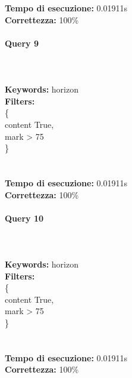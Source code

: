 \documentclass[12pt]{article}
\begin{document}
\noindent
\textbf{Tempo di esecuzione:} 0.01911s \\
\textbf{Correttezza:} 100\% \pagebreak

\paragraph{Query 9} ~ \\ \\

\noindent \textbf{Keywords: } horizon \\
\textbf{Filters: } \\
\indent \{ \\
\indent \indent content True, \\
\indent \indent mark > 75 \\
\indent \} \\\\\\


\noindent
\textbf{Tempo di esecuzione:} 0.01911s \\
\textbf{Correttezza:} 100\% \pagebreak

\paragraph{Query 10} ~ \\ \\

\noindent \textbf{Keywords: } horizon \\
\textbf{Filters: } \\
\indent \{ \\
\indent \indent content True, \\
\indent \indent mark > 75 \\
\indent \} \\\\\\


\noindent
\textbf{Tempo di esecuzione:} 0.01911s \\
\textbf{Correttezza:} 100\% \pagebreak
\end{document}

